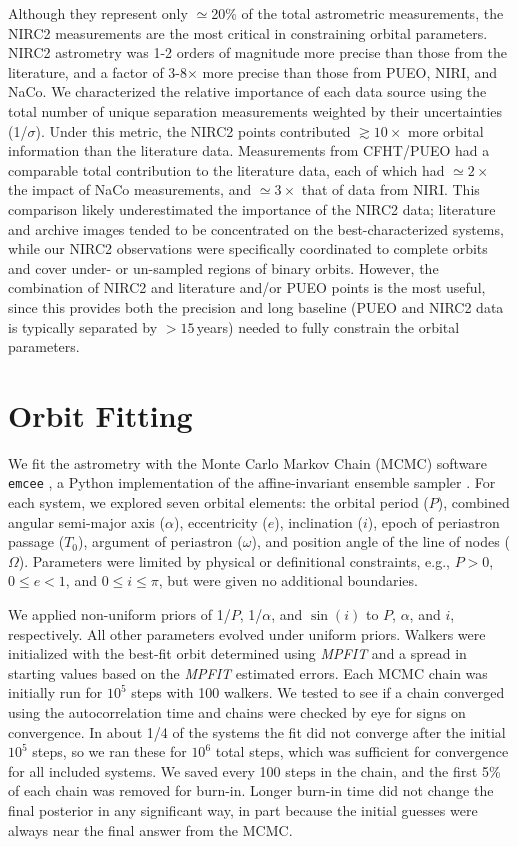 \documentclass[twocolumn]{aastex62}
\begin{document}
Although they represent only $\simeq$20\% of the total astrometric measurements, the NIRC2 measurements are the most critical in constraining orbital parameters. NIRC2 astrometry was 1-2 orders of magnitude more precise than those from the literature, and a factor of 3-8$\times$ more precise than those from PUEO, NIRI, and NaCo. We characterized the relative importance of each data source using the total number of unique separation measurements weighted by their uncertainties (1/$\sigma$). Under this metric, the NIRC2 points contributed $\gtrsim10\times$ more orbital information than the literature data. Measurements from CFHT/PUEO had a comparable total contribution to the literature data, each of which had $\simeq2\times$ the impact of NaCo measurements, and $\simeq3\times$ that of data from NIRI. This comparison likely underestimated the importance of the NIRC2 data; literature and archive images tended to be concentrated on the best-characterized systems, while our NIRC2 observations were specifically coordinated to complete orbits and cover under- or un-sampled regions of binary orbits. However, the combination of NIRC2 and literature and/or PUEO points is the most useful, since this provides both the precision and long baseline (PUEO and NIRC2 data is typically separated by $>15$\,years) needed to fully constrain the orbital parameters.

\section{Orbit Fitting}\label{sec:orbit}

We fit the astrometry with the Monte Carlo Markov Chain (MCMC) software {\tt emcee} \citep{Foreman-Mackey2013}, a Python implementation of the affine-invariant ensemble sampler \citep{goodman2010}. For each system, we explored seven orbital elements: the orbital period ($P$), combined angular semi-major axis ($\alpha$), eccentricity ($e$), inclination ($i$), epoch of periastron passage ($T_0$), argument of periastron ($\omega$), and position angle of the line of nodes ($\Omega$). Parameters were limited by physical or definitional constraints, e.g., $P>0$, $0 \le e<1$, and $0\le i \le \pi$, but were given no additional boundaries. 

We applied non-uniform priors of 1/$P$, 1/$\alpha$, and $\sin(i)$ to $P$, $\alpha$, and $i$, respectively. All other parameters evolved under uniform priors. Walkers were initialized with the best-fit orbit determined using \textit{MPFIT} \citep{Markwart2009} and a spread in starting values based on the \textit{MPFIT} estimated errors. Each MCMC chain was initially run for $10^5$ steps with 100 walkers. We tested to see if a chain converged using the autocorrelation time \citep{2010CAMCS...5...65G} and chains were checked by eye for signs on convergence. In about 1/4 of the systems the fit did not converge after the initial $10^5$ steps, so we ran these for $10^6$ total steps, which was sufficient for convergence for all included systems. We saved every 100 steps in the chain, and the first 5\% of each chain was removed for burn-in. Longer burn-in time did not change the final posterior in any significant way, in part because the initial guesses were always near the final answer from the MCMC. 
\end{document}
